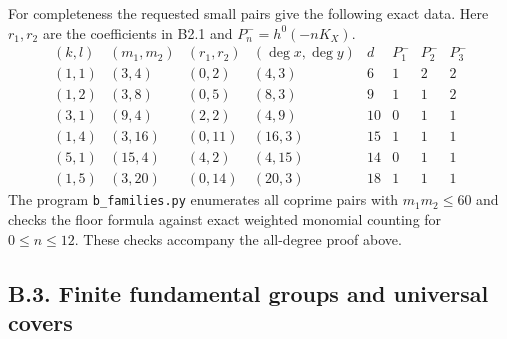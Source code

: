 For completeness the requested small pairs give the following exact data.
Here $r_1,r_2$ are the coefficients in B2.1 and $P_n^-=h^0(-nK_X)$.
\[
\begin{array}{c|c|c|c|c|ccc}
(k,l)&(m_1,m_2)&(r_1,r_2)&(\deg x,\deg y)&d&P^-_1&P^-_2&P^-_3\\\hline
(1,1)&(3,4)&(0,2)&(4,3)&6&1&2&2\\
(1,2)&(3,8)&(0,5)&(8,3)&9&1&1&2\\
(3,1)&(9,4)&(2,2)&(4,9)&10&0&1&1\\
(1,4)&(3,16)&(0,11)&(16,3)&15&1&1&1\\
(5,1)&(15,4)&(4,2)&(4,15)&14&0&1&1\\
(1,5)&(3,20)&(0,14)&(20,3)&18&1&1&1
\end{array}
\]
The program \texttt{b\_families.py} enumerates all coprime pairs with
$m_1m_2\le60$ and checks the floor formula against exact weighted
monomial counting for $0\le n\le12$. These checks accompany the
all-degree proof above.

\subsection{B.3. Finite fundamental groups and universal covers}

